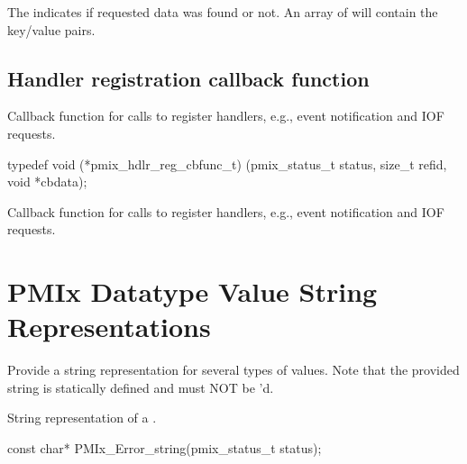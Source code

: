 \descr

The  indicates if requested data was found or not.
An array of  will contain the key/value pairs.

\subsection{Handler registration callback function}

\summary

Callback function for calls to register handlers, e.g., event notification and IOF requests.

\format

\cspecificstart
\begin{codepar}
typedef void (*pmix_hdlr_reg_cbfunc_t)
    (pmix_status_t status,
     size_t refid,
     void *cbdata);
\end{codepar}
\cspecificend

\begin{arglist}
\end{arglist}

\descr

Callback function for calls to register handlers, e.g., event notification and IOF requests.


\section{PMIx Datatype Value String Representations}

Provide a string representation for several types of values.
Note that the provided string is statically defined and must NOT be 'd.

\summary
{}

String representation of a .

\cspecificstart
\begin{codepar}
const char*
PMIx_Error_string(pmix_status_t status);
\end{codepar}
\cspecificend

